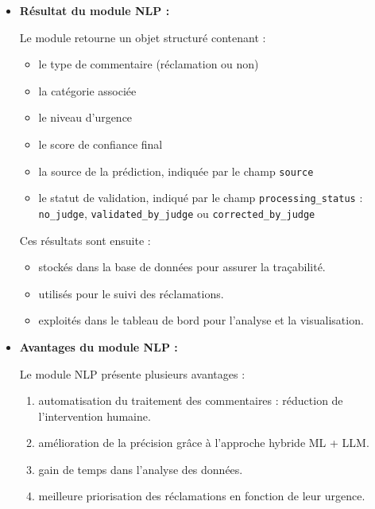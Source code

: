 \documentclass[12pt,a4paper,oneside]{report}
\begin{document}
\clearpage

\begin{itemize}
    \item \textbf{Résultat du module NLP :}

\vspace{0.3cm}
    Le module retourne un objet structuré contenant :
    \begin{itemize}
        \item le type de commentaire (réclamation ou non)
        \item la catégorie associée
        \item le niveau d’urgence
        \item le score de confiance final
        \item la source de la prédiction, indiquée par le champ \texttt{source}
        \item le statut de validation, indiqué par le champ \texttt{processing\_status} : \texttt{no\_judge}, \texttt{validated\_by\_judge} ou \texttt{corrected\_by\_judge}
    \end{itemize}
    Ces résultats sont ensuite :
    \begin{itemize}
            \item stockés dans la base de données pour assurer la traçabilité.
            \item utilisés pour le suivi des réclamations.
            \item exploités dans le tableau de bord pour l’analyse et la visualisation.
    \end{itemize}
\end{itemize}

\begin{itemize}
    \item \textbf{Avantages du module NLP :}

\vspace{0.3cm}
Le module NLP présente plusieurs avantages :

\begin{enumerate}
    \item automatisation du traitement des commentaires : réduction de l’intervention humaine.
    \item amélioration de la précision grâce à l’approche hybride ML + LLM.
    \item gain de temps dans l’analyse des données.
    \item meilleure priorisation des réclamations en fonction de leur urgence.
\end{enumerate}
\end{itemize}
\end{document}
